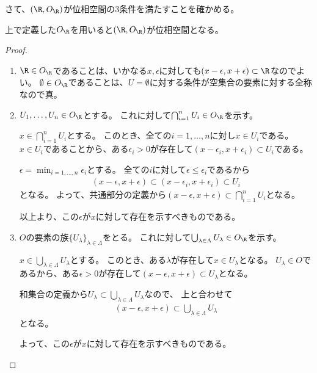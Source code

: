 \documentclass[uplatex]{jsarticle}
\begin{document}
さて、$(\R,O_\R)$が位相空間の$3$条件を満たすことを確かめる。

\begin{prop}
  上で定義した$O_\R$を用いると$(\R,O_\R)$が位相空間となる。
\end{prop}

\begin{proof}
  \begin{enumerate}
  \item $\R\in O_\R$であることは、いかなる$x,\epsilon$に対しても$(x-\epsilon,x+\epsilon)\subset\R$なのでよい。
    $\emptyset\in O_\R$であることは、$U=\emptyset$に対する条件が空集合の要素に対する全称なので真。
  \item $U_1,\ldots,U_n\in O_\R$とする。
    これに対して$\bigcap_{i=1}^nU_i\in O_\R$を示す。
    
    $x\in\bigcap_{i=1}^nU_i$とする。
    このとき、全ての$i=1,\ldots,n$に対し$x\in U_i$である。
    $x\in U_i$であることから、ある$\epsilon_i>0$が存在して$(x-\epsilon_i,x+\epsilon_i)\subset U_i$である。
    
    $\epsilon=\min_{i=1,\ldots,n}\epsilon_i$とする。
    全ての$i$に対して$\epsilon\leq \epsilon_i$であるから
    \begin{align*}
      (x-\epsilon,x+\epsilon)\subset(x-\epsilon_i,x+\epsilon_i)\subset U_i
    \end{align*}
    となる。
    よって、共通部分の定義から$(x-\epsilon,x+\epsilon)\subset\bigcap_{i=1}^nU_i$となる。

    以上より、この$\epsilon$が$x$に対して存在を示すべきものである。
  \item
    $O$の要素の族$\{U_\lambda\}_{\lambda\in\Lambda}$をとる。
    これに対して$\bigcup_{\lambda\in\Lambda}U_\lambda\in O_\R$を示す。
    
    $x\in\bigcup_{\lambda\in\Lambda}U_\lambda$とする。
    このとき、ある$\lambda$が存在して$x\in U_\lambda$となる。
    $U_\lambda\in O$であるから、ある$\epsilon>0$が存在して$(x-\epsilon,x+\epsilon)\subset U_\lambda$となる。
    
    和集合の定義から$U_\lambda\subset\bigcup_{\lambda\in\Lambda}U_\lambda$なので、
    上と合わせて
    \begin{align*}
      (x-\epsilon,x+\epsilon)\subset\bigcup_{\lambda\in\Lambda}U_\lambda
    \end{align*}
    となる。

    よって、この$\epsilon$が$x$に対して存在を示すべきものである。
  \end{enumerate}  
\end{proof}
\end{document}
